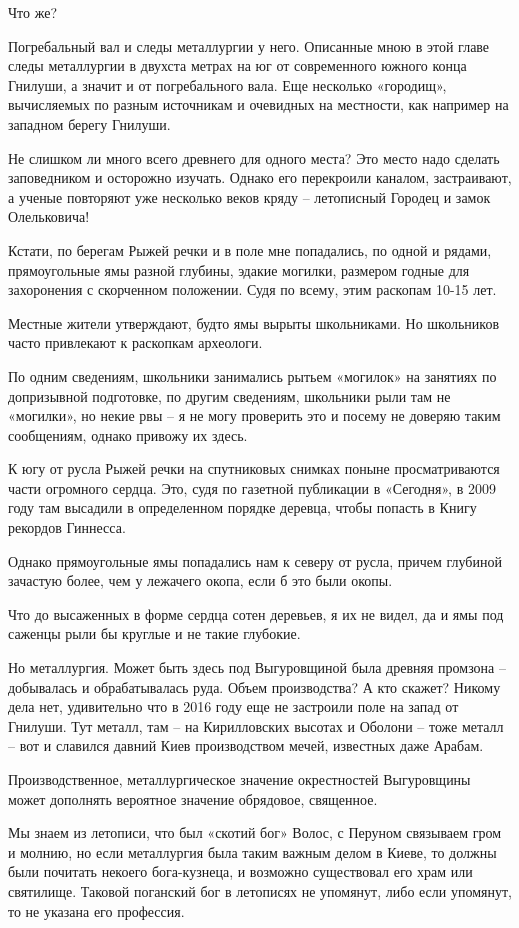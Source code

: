 Что же?

Погребальный вал и следы металлургии у него. Описанные мною в этой главе следы металлургии в двухста метрах на юг от современного южного конца Гнилуши, а значит и от погребального вала. Еще несколько «городищ», вычисляемых по разным источникам и очевидных на местности, как например на западном берегу Гнилуши.

Не слишком ли много всего древнего для одного места? Это место надо сделать заповедником и осторожно изучать. Однако его перекроили каналом, застраивают, а ученые повторяют уже несколько веков кряду – летописный Городец и замок Олельковича! 

Кстати, по берегам Рыжей речки и в поле мне попадались, по одной и рядами, прямоугольные ямы разной глубины, эдакие могилки, размером годные для захоронения с скорченном положении. Судя по всему, этим раскопам 10-15 лет.

Местные жители утверждают, будто ямы вырыты школьниками. Но школьников часто привлекают к раскопкам археологи.

По одним сведениям, школьники занимались рытьем «могилок» на занятиях по допризывной подготовке, по другим сведениям, школьники рыли там не «могилки», но некие рвы – я не могу проверить это и посему не доверяю таким сообщениям, однако привожу их здесь.

К югу от русла Рыжей речки на спутниковых снимках поныне просматриваются части огромного сердца. Это, судя по газетной публикации в «Сегодня», в 2009 году там высадили в определенном порядке деревца, чтобы попасть в Книгу рекордов Гиннесса.
 
Однако прямоугольные ямы попадались нам к северу от русла, причем глубиной зачастую более, чем у лежачего окопа, если б это были окопы.

Что до высаженных в форме сердца сотен деревьев, я их не видел, да и ямы под саженцы рыли бы круглые и не такие глубокие.

Но металлургия. Может быть здесь под Выгуровщиной была древняя промзона – добывалась и обрабатывалась руда. Объем производства? А кто скажет? Никому дела нет, удивительно что в 2016 году еще не застроили поле на запад от Гнилуши. Тут металл, там – на Кирилловских высотах и Оболони – тоже металл – вот и славился давний Киев производством мечей, известных даже Арабам.

Производственное, металлургическое значение окрес\-тностей Выгуровщины может дополнять вероятное значение обрядовое, священное.

Мы знаем из летописи, что был «скотий бог» Волос, с Перуном связываем гром и молнию, но если металлургия была таким важным делом в Киеве, то должны были почитать некоего бога-кузнеца, и возможно существовал его храм или святилище. Таковой поганский бог в летописях не упомянут, либо если упомянут, то не указана его профессия.

